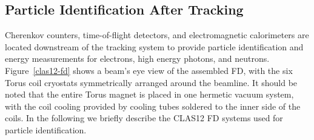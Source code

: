 \documentclass[final,3p,twocolumn]{elsarticle}
\begin{document}
\subsection{Particle Identification After Tracking}

Cherenkov counters, time-of-flight detectors, and electromagnetic calorimeters are located downstream of the
tracking system to provide particle identification and energy measurements for electrons, high energy photons,
and neutrons.  Figure~\ref{clas12-fd} shows a beam's eye view of the assembled FD, with the six Torus coil
cryostats symmetrically arranged around the beamline. It should be noted that the entire Torus magnet is placed
in one hermetic vacuum system, with the coil cooling provided by cooling tubes soldered to the inner side of the coils.  
In the following we briefly describe the CLAS12 FD systems used for particle identification. 

\end{document}
